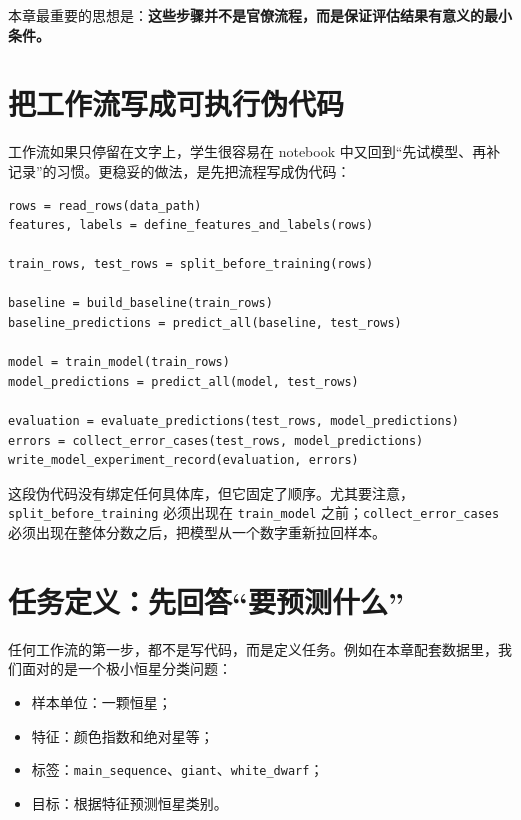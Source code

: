 本章最重要的思想是：\textbf{这些步骤并不是官僚流程，而是保证评估结果有意义的最小条件。}

\section{把工作流写成可执行伪代码}

工作流如果只停留在文字上，学生很容易在 notebook 中又回到“先试模型、再补记录”的习惯。更稳妥的做法，是先把流程写成伪代码：

\begin{examplebox}
\begin{lstlisting}[style=pythonstyle]
rows = read_rows(data_path)
features, labels = define_features_and_labels(rows)

train_rows, test_rows = split_before_training(rows)

baseline = build_baseline(train_rows)
baseline_predictions = predict_all(baseline, test_rows)

model = train_model(train_rows)
model_predictions = predict_all(model, test_rows)

evaluation = evaluate_predictions(test_rows, model_predictions)
errors = collect_error_cases(test_rows, model_predictions)
write_model_experiment_record(evaluation, errors)
\end{lstlisting}
\end{examplebox}

这段伪代码没有绑定任何具体库，但它固定了顺序。尤其要注意，\texttt{split\_before\_training} 必须出现在 \texttt{train\_model} 之前；\texttt{collect\_error\_cases} 必须出现在整体分数之后，把模型从一个数字重新拉回样本。

\section{任务定义：先回答“要预测什么”}

任何工作流的第一步，都不是写代码，而是定义任务。例如在本章配套数据里，我们面对的是一个极小恒星分类问题：

\begin{itemize}
    \item 样本单位：一颗恒星；
    \item 特征：颜色指数和绝对星等；
    \item 标签：\texttt{main\_sequence}、\texttt{giant}、\texttt{white\_dwarf}；
    \item 目标：根据特征预测恒星类别。
\end{itemize}

